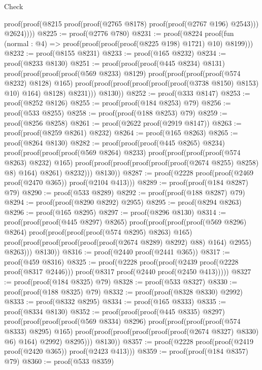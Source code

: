 \begin{lexlean}{Check}
\begin{coremodule}
          proof(proof(@8215 proof(proof(@2765 @8178) proof(proof(@2767 @196) @2543))) @2624))))
@8225 := proof(@2776 @780)
@8231 := proof(@8224
      proof(fun (normal : @4) => proof(proof(proof(proof(@8225 @198) @1721) @10) @8199)))
@8232 := proof(@8155 @8231)
@8233 := proof(@165 @8232)
@8234 := proof(@8233 @8130)
@8251 := proof(proof(proof(@445 @8234) @8131)
      proof(proof(proof(proof(@569 @8233) @8129)
            proof(proof(proof(proof(@574 @8232) @8128) @165)
                proof(proof(proof(proof(proof(proof(@3738 @8150) @8153) @10) @164) @8128) @8231)))
          @8130))
@8252 := proof(@333 @8147)
@8253 := proof(@8252 @8126)
@8255 := proof(proof(@184 @8253) @79)
@8256 := proof(@533 @8255)
@8258 := proof(proof(@188 @8253) @79)
@8259 := proof(@8256 @8258)
@8261 := proof(@2622 proof(@2919 @8147))
@8263 := proof(proof(@8259 @8261) @8232)
@8264 := proof(@165 @8263)
@8265 := proof(@8264 @8130)
@8282 := proof(proof(proof(@445 @8265) @8234)
      proof(proof(proof(proof(@569 @8264) @8233)
            proof(proof(proof(proof(@574 @8263) @8232) @165)
                proof(proof(proof(proof(proof(proof(@2674 @8255) @8258) @8) @164) @8261) @8232)))
          @8130))
@8287 := proof(@2228 proof(proof(@2469 proof(@2470 @365)) proof(@2104 @413)))
@8289 := proof(proof(@184 @8287) @79)
@8290 := proof(@533 @8289)
@8292 := proof(proof(@188 @8287) @79)
@8294 := proof(proof(@8290 @8292) @2955)
@8295 := proof(@8294 @8263)
@8296 := proof(@165 @8295)
@8297 := proof(@8296 @8130)
@8314 := proof(proof(proof(@445 @8297) @8265)
      proof(proof(proof(proof(@569 @8296) @8264)
            proof(proof(proof(proof(@574 @8295) @8263) @165)
                proof(proof(proof(proof(proof(proof(@2674 @8289) @8292) @88) @164) @2955) @8263)))
          @8130))
@8316 := proof(@2440 proof(@2441 @365))
@8317 := proof(@459 @8316)
@8325 := proof(@2228
      proof(proof(@2439 proof(@2228 proof(@8317 @2446)))
          proof(@8317 proof(@2440 proof(@2450 @413)))))
@8327 := proof(proof(@184 @8325) @79)
@8328 := proof(@533 @8327)
@8330 := proof(proof(@188 @8325) @79)
@8332 := proof(proof(@8328 @8330) @2992)
@8333 := proof(@8332 @8295)
@8334 := proof(@165 @8333)
@8335 := proof(@8334 @8130)
@8352 := proof(proof(proof(@445 @8335) @8297)
      proof(proof(proof(proof(@569 @8334) @8296)
            proof(proof(proof(proof(@574 @8333) @8295) @165)
                proof(proof(proof(proof(proof(proof(@2674 @8327) @8330) @6) @164) @2992) @8295)))
          @8130))
@8357 := proof(@2228 proof(proof(@2419 proof(@2420 @365)) proof(@2423 @413)))
@8359 := proof(proof(@184 @8357) @79)
@8360 := proof(@533 @8359)

\end{coremodule}
\end{lexlean}
